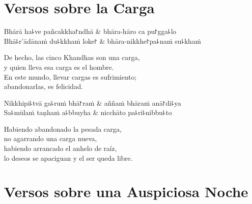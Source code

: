 \chapter{Versos sobre la Carga}


\begin{leader}
\end{leader}

\begin{twochants}
Bhārā ha꜕ve pañcakkha꜓ndhā & bhāra-hāro ca pu꜓gga꜕lo \\
Bhā꜕r'ādānaṁ du꜕kkhaṁ loke꜓ & bhāra-nikkhe꜓pa꜕naṁ su꜕khaṁ \\
\end{twochants}

\begin{english}
  De hecho, las cinco Khandhas son una carga,\\
  y quien lleva esa carga es el hombre.\\
  En este mundo, llevar cargas es sufrimiento;\\
  abandonarlas, es felicidad.
\end{english}

\begin{twochants}
Nikkhipi꜕tvā ga꜕ruṁ bhā꜓raṁ & aññaṁ bhāraṁ anā꜓di꜕ya \\
Sa꜕mūlaṁ taṇhaṁ a꜕bbuyha & nicchāto pa꜕ri꜕nibbu꜕to \\
\end{twochants}

\begin{english}
  Habiendo abandonado la pesada carga,\\
  no agarrando una carga nueva,\\
  habiendo arrancado el anhelo de raíz,\\
  lo deseos se apaciguan y el ser queda libre.
\end{english}

\chapter{Versos sobre una Auspiciosa Noche}


\begin{leader}
\end{leader}

